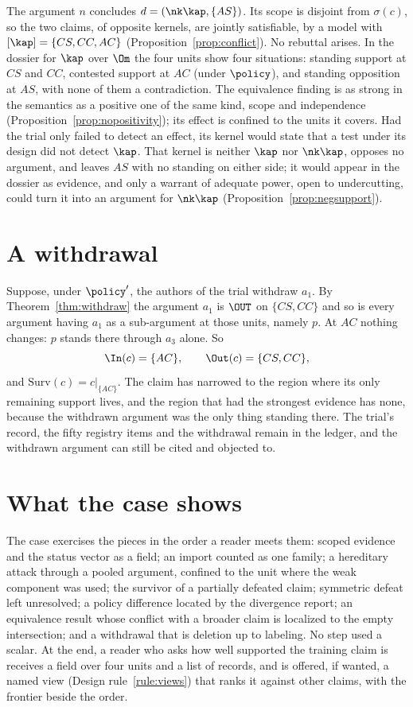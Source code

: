 The argument $n$ concludes $d=(\nk\kap,\{AS\})$. Its scope is disjoint from $\sigma(c)$, so the two claims, of opposite kernels, are jointly satisfiable, by a model with $[\kap]=\{CS,CC,AC\}$ (Proposition~\ref{prop:conflict}). No rebuttal arises. In the dossier for $\kap$ over $\Om$ the four units show four situations: standing support at $CS$ and $CC$, contested support at $AC$ (under $\policy$), and standing opposition at $AS$, with none of them a contradiction. The equivalence finding is as strong in the semantics as a positive one of the same kind, scope and independence (Proposition~\ref{prop:nopositivity}); its effect is confined to the units it covers. Had the trial only failed to detect an effect, its kernel would state that a test under its design did not detect $\kap$. That kernel is neither $\kap$ nor $\nk\kap$, opposes no argument, and leaves $AS$ with no standing on either side; it would appear in the dossier as evidence, and only a warrant of adequate power, open to undercutting, could turn it into an argument for $\nk\kap$ (Proposition~\ref{prop:negsupport}).

\section{A withdrawal}\label{sec:case2withdraw}

Suppose, under $\policy'$, the authors of the trial withdraw $a_1$. By Theorem~\ref{thm:withdraw} the argument $a_1$ is $\OUT$ on $\{CS,CC\}$ and so is every argument having $a_1$ as a sub-argument at those units, namely $p$. At $AC$ nothing changes: $p$ stands there through $a_3$ alone. So
\[
\In(c)=\{AC\},\qquad\Out(c)=\{CS,CC\},
\]
and $\mathrm{Surv}(c)=c|_{\{AC\}}$. The claim has narrowed to the region where its only remaining support lives, and the region that had the strongest evidence has none, because the withdrawn argument was the only thing standing there. The trial's record, the fifty registry items and the withdrawal remain in the ledger, and the withdrawn argument can still be cited and objected to.

\section{What the case shows}\label{sec:case2lessons}

The case exercises the pieces in the order a reader meets them: scoped evidence and the status vector as a field; an import counted as one family; a hereditary attack through a pooled argument, confined to the unit where the weak component was used; the survivor of a partially defeated claim; symmetric defeat left unresolved; a policy difference located by the divergence report; an equivalence result whose conflict with a broader claim is localized to the empty intersection; and a withdrawal that is deletion up to labeling. No step used a scalar. At the end, a reader who asks how well supported the training claim is receives a field over four units and a list of records, and is offered, if wanted, a named view (Design rule~\ref{rule:views}) that ranks it against other claims, with the frontier beside the order.

